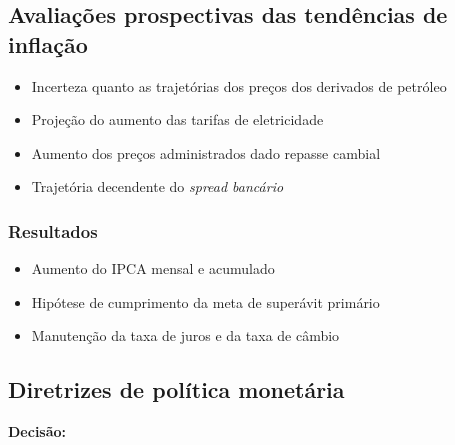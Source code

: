 \documentclass[11pt]{article}
\begin{document}
\subsection*{Avaliações prospectivas das tendências de inflação}
\label{sec:org4ac4d20}
\begin{itemize}
\item Incerteza quanto as trajetórias dos preços dos derivados de petróleo
\item Projeção do aumento das tarifas de eletricidade
\item Aumento dos preços administrados dado repasse cambial
\item Trajetória decendente do \emph{spread bancário}
\end{itemize}


\subsubsection*{Resultados}
\label{sec:org86d2198}

\begin{itemize}
\item Aumento do IPCA mensal e acumulado
\item Hipótese de cumprimento da meta de superávit primário
\item Manutenção da taxa de juros e da taxa de câmbio
\end{itemize}
\subsection*{Diretrizes de política monetária}
\label{sec:org81e5f26}
\textbf{Decisão:} 
\end{document}
